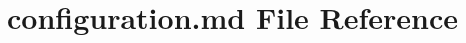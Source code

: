 \hypertarget{configuration_8md}{\section{configuration.\-md File Reference}
\label{configuration_8md}
}
